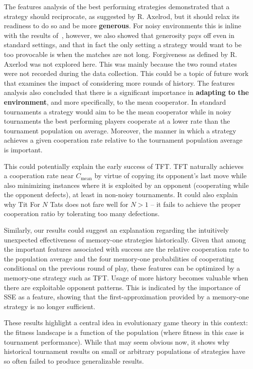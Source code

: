 \documentclass{article}
\begin{document}
The features analysis of the best performing strategies demonstrated that a
strategy should reciprocate, as suggested by R. Axelrod, but it should relax its
readiness to do so and be more \textbf{generous}. For noisy environments this is
inline with the results of~\cite{Bendor1991, Donninger1986, Molander1985,
Hammerstein1984}, however, we also showed that generosity pays off even in
standard settings, and that in fact the only setting a strategy would want to be
too provocable is when the matches are not long. Forgiveness as defined by R.
Axerlod was not explored here. This was mainly because the two round states were
not recorded during the data collection. This could be a topic of future work
that examines the impact of considering more rounds of history.
The features analysis also concluded that
there is a significant importance in \textbf{adapting to the environment}, and
more specifically, to the mean cooperator. 
In standard tournaments a strategy would aim to be the
mean cooperator while in noisy tournaments the best performing players
cooperate at a lower rate than the tournament population on average.
Moreover, the manner in which a
strategy achieves a given cooperation rate relative to the tournament population
average is important.

This could potentially explain the early success of TFT. TFT naturally achieves
a cooperation rate near $C_{\text{mean}}$ by virtue of copying its opponent's
last move while also minimizing instances where it is exploited by an opponent
(cooperating while the opponent defects), at least in non-noisy tournaments. It
could also explain why Tit For \(N\) Tats does not fare well for $N > 1$ -- it
fails to achieve the proper cooperation ratio by tolerating too many defections.

Similarly, our results could suggest an explanation regarding the intuitively
unexpected effectiveness of memory-one strategies historically. Given that among
the important features associated with success are the relative cooperation rate
to the population average and the four memory-one probabilities of cooperating
conditional on the previous round of play, these features can be optimized by a
memory-one strategy such as TFT. Usage of more history becomes valuable when
there are exploitable opponent patterns. This is indicated by the importance of
SSE as a feature, showing that the first-approximation provided by a memory-one
strategy is no longer sufficient.

These results highlight a central idea in evolutionary game theory in this
context: the fitness landscape is a function of the population (where fitness in
this case is tournament performance). While that may seem obvious now, it shows
why historical tournament results on small or arbitrary populations of
strategies have so often failed to produce generalizable results.
\end{document}
